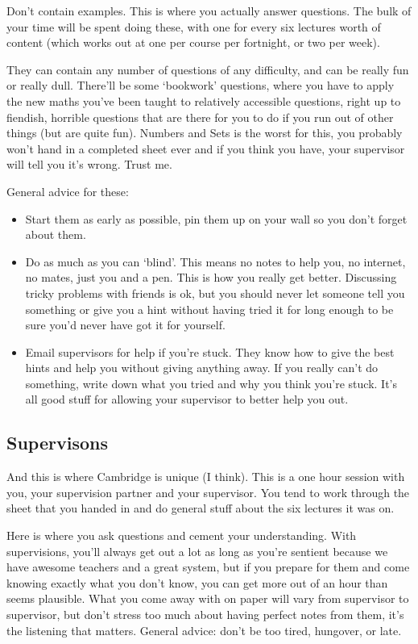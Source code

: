 \documentclass[a4paper,11pt]{article}
\begin{document}
Don't contain examples. This is where you actually answer questions. The bulk of your time will be spent doing these, with one for every six lectures worth of content (which works out at one per course per fortnight, or two per week). 

They can contain any number of questions of any difficulty, and can be really fun or really dull. There'll be some `bookwork' questions, where you have to apply the new maths you've been taught to relatively accessible questions, right up to fiendish, horrible questions that are there for you to do if you run out of other things (but are quite fun). Numbers and Sets is the worst for this, you probably won't hand in a completed sheet ever and if you think you have, your supervisor will tell you it's wrong. Trust me.

General advice for these:
\begin{itemize}
    \item Start them as early as possible, pin them up on your wall so you don't forget about them.
    \item Do as much as you can `blind'. This means no notes to help you, no internet, no mates, just you and a pen. This is how you really get better. Discussing tricky problems with friends is ok, but you should never let someone tell you something or give you a hint without having tried it for long enough to be sure you'd never have got it for yourself. 
    \item Email supervisors for help if you're stuck. They know how to give the best hints and help you without giving anything away. If you really can't do something, write down what you tried and why you think you're stuck. It's all good stuff for allowing your supervisor to better help you out.
\end{itemize}

\subsection{Supervisons}

And this is where Cambridge is unique (I think). This is a one hour session with you, your supervision partner and your supervisor. You tend to work through the sheet that you handed in and do general stuff about the six lectures it was on. 

Here is where you ask questions and cement your understanding. With supervisions, you'll always get out a lot as long as you're sentient because we have awesome teachers and a great system, but if you prepare for them and come knowing exactly what you don't know, you can get more out of an hour than seems plausible. What you come away with on paper will vary from supervisor to supervisor, but don't stress too much about having perfect notes from them, it's the listening that matters. General advice: don't be too tired, hungover, or late.
\end{document}
